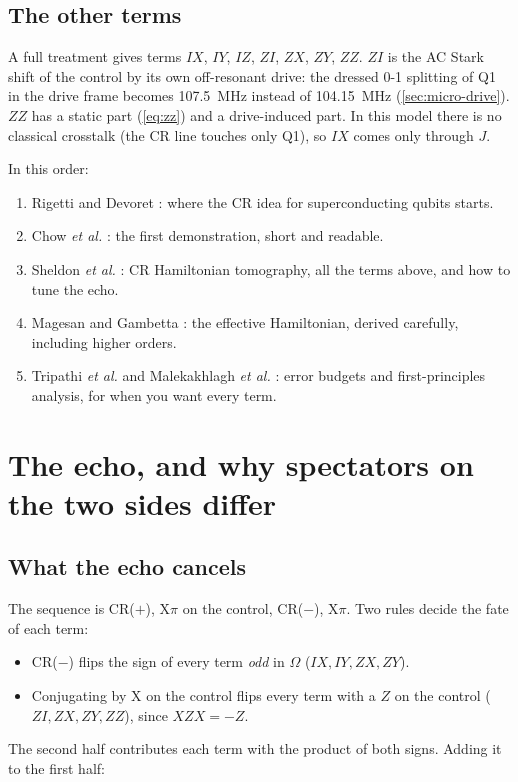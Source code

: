 \documentclass[11pt,a4paper]{article}
\begin{document}
\subsection{The other terms}

A full treatment \cite{sheldon2016,magesan2020} gives terms \(I\!X\), \(I\!Y\), \(I\!Z\), \(Z\!I\), \(Z\!X\), \(Z\!Y\), \(Z\!Z\).
\(Z\!I\) is the AC Stark shift of the control by its own off-resonant drive: the dressed 0-1 splitting of Q1 in the drive
frame becomes 107.5~MHz instead of 104.15~MHz (\cref{sec:micro-drive}). \(Z\!Z\) has a static part (\cref{eq:zz}) and a
drive-induced part. In this model there is no classical crosstalk (the CR line touches only Q1), so \(I\!X\) comes only
through \(J\).

\begin{readbox}
In this order:
\begin{enumerate}
\item Rigetti and Devoret \cite{rigetti2010}: where the CR idea for superconducting qubits starts.
\item Chow \emph{et al.} \cite{chow2011}: the first demonstration, short and readable.
\item Sheldon \emph{et al.} \cite{sheldon2016}: CR Hamiltonian tomography, all the terms above, and how to tune the echo.
\item Magesan and Gambetta \cite{magesan2020}: the effective Hamiltonian, derived carefully, including higher orders.
\item Tripathi \emph{et al.} \cite{tripathi2019} and Malekakhlagh \emph{et al.} \cite{malekakhlagh2020}: error
  budgets and first-principles analysis, for when you want every term.
\end{enumerate}
\end{readbox}

\section{The echo, and why spectators on the two sides differ}\label{sec:echo}

\subsection{What the echo cancels}

The sequence is CR(\(+\)), X\(\pi\) on the control, CR(\(-\)), X\(\pi\). Two rules decide the fate of each term:
\begin{itemize}
\item CR(\(-\)) flips the sign of every term \emph{odd} in \(\Omega\) (\(I\!X, I\!Y, Z\!X, Z\!Y\)).
\item Conjugating by X on the control flips every term with a \(Z\) on the control (\(Z\!I, Z\!X, Z\!Y, Z\!Z\)), since
  \(XZX = -Z\).
\end{itemize}
The second half contributes each term with the product of both signs. Adding it to the first half:
\end{document}
